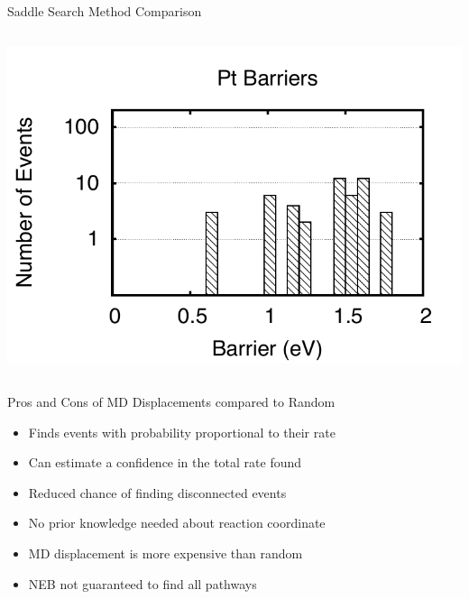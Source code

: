 \documentclass[onlymath]{beamer}
\begin{document}
\begin{frame}{Saddle Search Method Comparison}
\begin{columns}
\begin{column}{0.4\textwidth}
\includegraphics[width=\columnwidth]{images/pt-barriers.pdf}

\end{column}
\end{columns}

\end{frame}


\begin{frame}{Pros and Cons of MD Displacements compared to Random}
 \begin{tcolorbox}[title=Pros,colback=white,colframe=green!50!black,]
    \begin{itemize}
	\item Finds events with probability proportional to their rate
	\item Can estimate a confidence in the total rate found
	\item Reduced chance of finding disconnected events
	\item No prior knowledge needed about reaction coordinate
    \end{itemize}
  \end{tcolorbox}

  \vspace{2mm}

  \begin{tcolorbox}[title=Cons,colback=white,colframe=red!50!black,]
    \begin{itemize}
	\item MD displacement is more expensive than random
	\item NEB not guaranteed to find all pathways 
    \end{itemize}
  \end{tcolorbox}
\end{frame}
\end{document}
